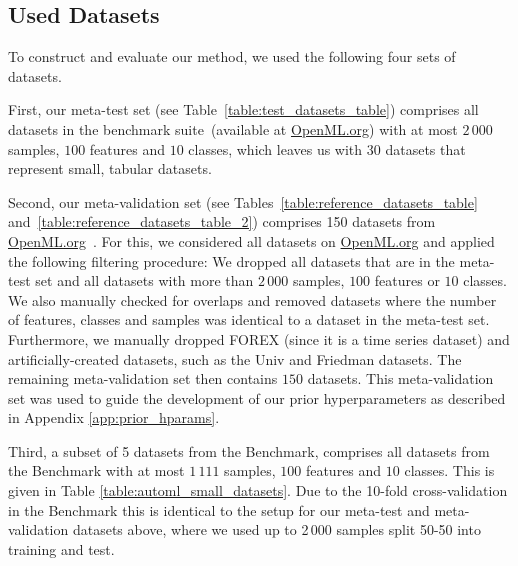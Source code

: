 \documentclass{article}
\begin{document}
\subsection{Used Datasets}\label{app:ssec:datasets}

To construct and evaluate our method, we used the following four sets of datasets. 

First, our meta-test set (see Table~\ref{table:test_datasets_table}) comprises all datasets in the \openmlcc{} benchmark suite~\citep{bischl-neuripsdbt21a}(available at \url{OpenML.org}) with at most $2\,000$ samples, $100$ features and $10$ classes, which leaves us with $30$ datasets that represent small, tabular datasets.

Second, our meta-validation set (see Tables~\ref{table:reference_datasets_table} and~\ref{table:reference_datasets_table_2}) comprises 150 datasets from \url{OpenML.org}~\citep{vanschoren-sigkdd14a}. For this, we considered all datasets on \url{OpenML.org} and applied the following filtering procedure: We dropped all datasets that are in the meta-test set and all datasets with more than $2\,000$ samples, $100$ features or $10$ classes. We also manually checked for overlaps and removed datasets where the number of features, classes and samples was identical to a dataset in the meta-test set. Furthermore, we manually dropped FOREX (since it is a time series dataset) and artificially-created datasets, such as the Univ and Friedman datasets. The remaining meta-validation set then contains $150$ datasets. This meta-validation set was used to guide the development of our prior hyperparameters as described in Appendix \ref{app:prior_hparams}.

Third, a subset of 5 datasets from the \openmlautoml{} Benchmark, comprises all datasets from the \openmlautoml{} Benchmark with at most $1\,111$ samples, $100$ features and $10$ classes. This is given in Table \ref{table:automl_small_datasets}. Due to the 10-fold cross-validation in the \openmlautoml{} Benchmark this is identical to the setup for our meta-test and meta-validation datasets above, where we used up to 2\,000 samples split 50-50 into training and test.
\end{document}
